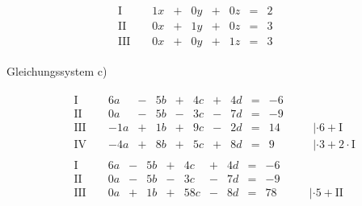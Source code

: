 \begin{exercise}
\begin{minipage}{0.49\linewidth}
\begin{align*}
\begin{array}{r|rrrrrrrrrl}
      \text{I}{\,} & {\,} & \num{1}x & + & \num{0}y & + & \num{0}z & = & \num{2} & {\quad} &   \\
     \text{II}{\,} & {\,} & \num{0}x & + & \num{1}y & + & \num{0}z & = & \num{3} & {\quad} &   \\
    \text{III}{\,} & {\,} & \num{0}x & + & \num{0}y & + & \num{1}z & = & \num{3} & {\quad} &
    \end{array}
    \end{align*}
    \end{minipage}%
    \endgroup
    \par Gleichungssystem c)\par
    \begingroup
      \footnotesize
      \setlength{\arraycolsep}{1pt}%
      \begin{minipage}[t]{0.49\linewidth}
        \vspace*{-\abovedisplayskip}
        \begin{align*}
        &
        \begin{array}{r|rrrrrrrrrrrl}
          \text{I}{\,} & {\,} &  \num{6}a & - & \num{5}b & + & \num{4}c & + & \num{4}d & = & -\num{6} & {\quad} &                                    \\
         \text{II}{\,} & {\,} &  \num{0}a & - & \num{5}b & - & \num{3}c & - & \num{7}d & = & -\num{9} & {\quad} &                                    \\
        \text{III}{\,} & {\,} & -\num{1}a & + & \num{1}b & + & \num{9}c & - & \num{2}d & = & \num{14} & {\quad} & |\cdot\num{6}+\text{I}             \\
         \text{IV}{\,} & {\,} & -\num{4}a & + & \num{8}b & + & \num{5}c & + & \num{8}d & = &  \num{9} & {\quad} & |\cdot\num{3}+\num{2}\cdot\text{I}
        \end{array}
        \\[1ex]&
        \begin{array}{r|rrrrrrrrrrrl}
          \text{I}{\,} & {\,} & \num{6}a & - &  \num{5}b & + &  \num{4}c & + &  \num{4}d & = & -\num{6} & {\quad} &                                      \\
         \text{II}{\,} & {\,} & \num{0}a & - &  \num{5}b & - &  \num{3}c & - &  \num{7}d & = & -\num{9} & {\quad} &                                      \\
        \text{III}{\,} & {\,} & \num{0}a & + &  \num{1}b & + & \num{58}c & - &  \num{8}d & = & \num{78} & {\quad} & |\cdot\num{5}+\text{II}              \\

\end{array}
\end{align*}
\end{minipage}
\end{exercise}
